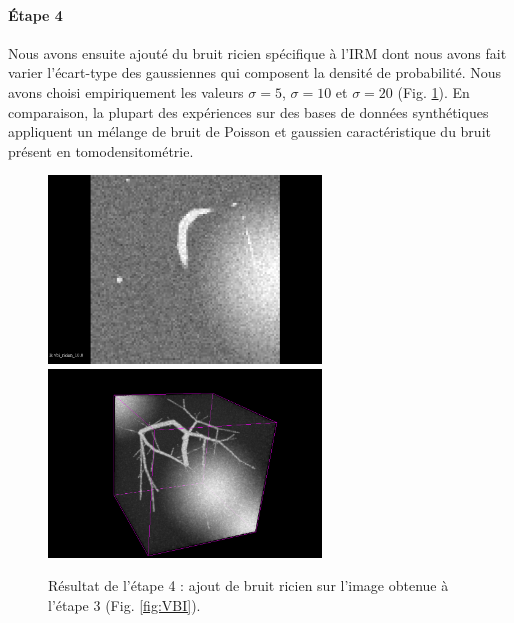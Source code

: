 \paragraph{Étape 4}
Nous avons ensuite ajouté du bruit ricien spécifique à l'IRM dont nous avons fait varier l'écart-type des gaussiennes qui composent la densité de probabilité. Nous avons choisi empiriquement les valeurs $\sigma=5$, $\sigma=10$ et $\sigma=20$ (Fig. \ref{fig:VBIR}). En comparaison, la plupart des expériences sur des bases de données synthétiques appliquent un mélange de bruit de Poisson et gaussien caractéristique du bruit présent en tomodensitométrie.
\begin{figure}[!ht]
  \centering
  \includegraphics[height=5cm]{Images/2D_VBIR10.png}
  \includegraphics[height=5cm]{Images/3D_VBIR10.png}
  \caption{Résultat de l'étape 4 : ajout de bruit ricien sur l'image obtenue à l'étape 3 (Fig. \ref{fig:VBI}).}
  \label{fig:VBIR}
\end{figure}
